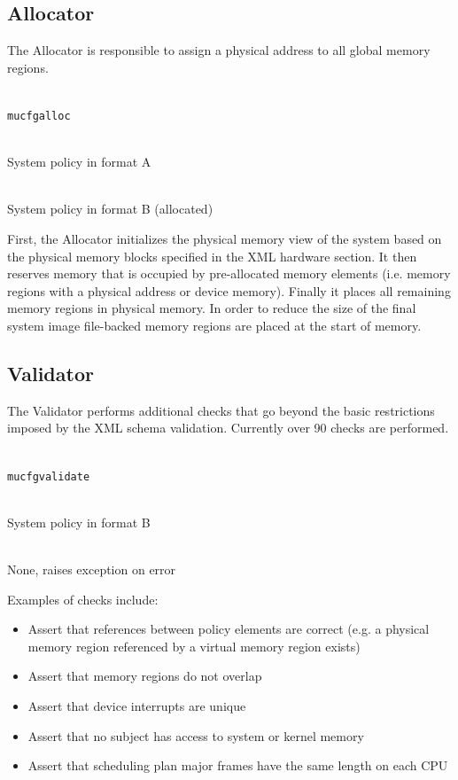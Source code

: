 \documentclass[a4paper,twoside,titlepage]{article}
\begin{document}
\subsection{Allocator}
\label{sec:tools-allocator}
The Allocator is responsible to assign a physical address to all global memory
regions.

\begin{description} \itemsep1pt \parskip0pt
	\item[Name] \hfill \\
		\texttt{mucfgalloc}
	\item[Input] \hfill \\
		System policy in format A
	\item[Output] \hfill \\
		System policy in format B (allocated)
\end{description}

First, the Allocator initializes the physical memory view of the system based
on the physical memory blocks specified in the XML hardware section. It then
reserves memory that is occupied by pre-allocated memory elements (i.e. memory
regions with a physical address or device memory).  Finally it places all
remaining memory regions in physical memory.  In order to reduce the size of
the final system image file-backed memory regions are placed at the start of
memory.

\subsection{Validator}
\label{sec:tools-validator}
The Validator performs additional checks that go beyond the basic restrictions
imposed by the XML schema validation. Currently over 90 checks are performed.

\begin{description} \itemsep1pt \parskip0pt
	\item[Name] \hfill \\
		\texttt{mucfgvalidate}
	\item[Input] \hfill \\
		System policy in format B
	\item[Output] \hfill \\
		None, raises exception on error
\end{description}

Examples of checks include:

\begin{itemize}
	\item Assert that references between policy elements are correct (e.g. a
		physical memory	region referenced by a virtual memory region exists)
	\item Assert that memory regions do not overlap
	\item Assert that device interrupts are unique
	\item Assert that no subject has access to system or kernel memory
	\item Assert that scheduling plan major frames have the same length on each
		CPU
\end{itemize}
\end{document}
